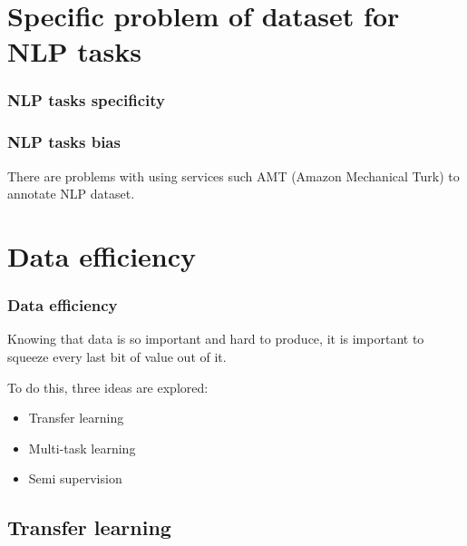\documentclass[10pt]{beamer}
\begin{document}
\section{Specific problem of dataset for NLP tasks}

\begin{frame}

  \frametitle{NLP tasks specificity}

\end{frame}

\begin{frame}

  \frametitle{NLP tasks bias}

  There are problems with using services such AMT (Amazon Mechanical
  Turk) to annotate NLP dataset.

\end{frame}
\section{Data efficiency}

\begin{frame}
  \frametitle{Data efficiency}

  Knowing that data is so important and hard to produce, it is
  important to squeeze every last bit of value out of it.

  \bigskip

  To do this, three ideas are explored:
  \begin{itemize}
    \item Transfer learning
    \item Multi-task learning
    \item Semi supervision
  \end{itemize}

\end{frame}

\subsection{Transfer learning}
\end{document}
